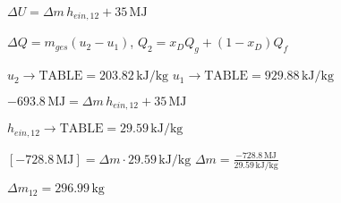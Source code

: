 \( \Delta U = \Delta m \, h_{ein,12} + 35 \, \text{MJ} \)  

\( \Delta Q = m_{ges} (u_2 - u_1) \), \( Q_2 = x_D Q_g + (1 - x_D) Q_f \)  

\( u_2 \rightarrow \text{TABLE} = 203.82 \, \text{kJ/kg} \)  
\( u_1 \rightarrow \text{TABLE} = 929.88 \, \text{kJ/kg} \)  

\( -693.8 \, \text{MJ} = \Delta m \, h_{ein,12} + 35 \, \text{MJ} \)  

\( h_{ein,12} \rightarrow \text{TABLE} = 29.59 \, \text{kJ/kg} \)  

\( [-728.8 \, \text{MJ}] = \Delta m \cdot 29.59 \, \text{kJ/kg} \)  
\( \Delta m = \frac{-728.8 \, \text{MJ}}{29.59 \, \text{kJ/kg}} \)  

\( \Delta m_{12} = 296.99 \, \text{kg} \)